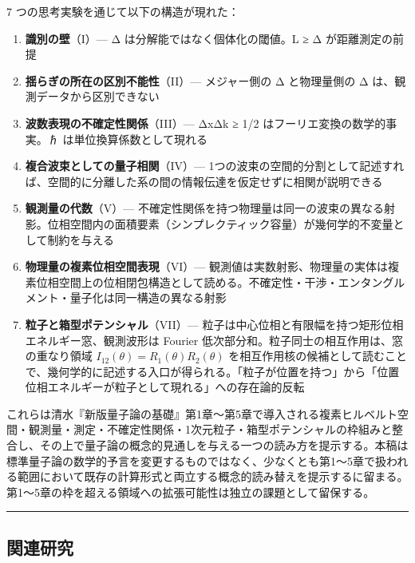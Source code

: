 \documentclass[
]{ltjsarticle}
\providecommand{\tightlist}{%
  \setlength{\itemsep}{0pt}\setlength{\parskip}{0pt}}
\begin{document}
7 つの思考実験を通じて以下の構造が現れた：

\begin{enumerate}
\def\labelenumi{\arabic{enumi}.}
\tightlist
\item
  \textbf{識別の壁}（I）--- Δ は分解能ではなく個体化の閾値。L ≥ Δ
  が距離測定の前提
\item
  \textbf{揺らぎの所在の区別不能性}（II）--- メジャー側の Δ と物理量側の
  Δ は、観測データから区別できない
\item
  \textbf{波数表現の不確定性関係}（III）--- ΔxΔk ≥ 1/2
  はフーリエ変換の数学的事実。ℏ は単位換算係数として現れる
\item
  \textbf{複合波束としての量子相関}（IV）---
  1つの波束の空間的分割として記述すれば、空間的に分離した系の間の情報伝達を仮定せずに相関が説明できる
\item
  \textbf{観測量の代数}（V）---
  不確定性関係を持つ物理量は同一の波束の異なる射影。位相空間内の面積要素（シンプレクティック容量）が幾何学的不変量として制約を与える
\item
  \textbf{物理量の複素位相空間表現}（VI）---
  観測値は実数射影、物理量の実体は複素位相空間上の位相閉包構造として読める。不確定性・干渉・エンタングルメント・量子化は同一構造の異なる射影
\item
  \textbf{粒子と箱型ポテンシャル}（VII）---
  粒子は中心位相と有限幅を持つ矩形位相エネルギー窓、観測波形は Fourier
  低次部分和。粒子同士の相互作用は、窓の重なり領域
  \(I_{12}(\theta) = R_1(\theta) R_2(\theta)\)
  を相互作用核の候補として読むことで、幾何学的に記述する入口が得られる。「粒子が位置を持つ」から「位置位相エネルギーが粒子として現れる」への存在論的反転
\end{enumerate}

これらは清水『新版量子論の基礎』第1章〜第5章で導入される複素ヒルベルト空間・観測量・測定・不確定性関係・1次元粒子・箱型ポテンシャルの枠組みと整合し、その上で量子論の概念的見通しを与える一つの読み方を提示する。本稿は標準量子論の数学的予言を変更するものではなく、少なくとも第1〜5章で扱われる範囲において既存の計算形式と両立する概念的読み替えを提示するに留まる。第1〜5章の枠を超える領域への拡張可能性は独立の課題として留保する。

\begin{center}\rule{0.5\linewidth}{0.5pt}\end{center}

\subsection{関連研究}\label{ux95a2ux9023ux7814ux7a76}
\end{document}
